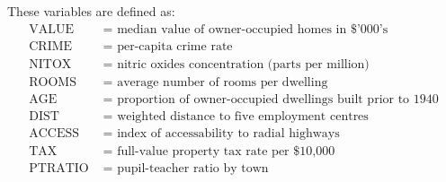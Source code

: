 \documentclass[12pt,a4paper]{article}
\begin{document}
These variables are defined as:
\begin{align*}
\mbox{ VALUE } & = \mbox{ median value of owner-occupied homes in \$'000's }\\
\mbox{ CRIME } & = \mbox{ per-capita crime rate }\\
\mbox{ NITOX } & = \mbox{ nitric oxides concentration (parts per million) }\\
\mbox{ ROOMS } & = \mbox{ average number of rooms per dwelling }\\
\mbox{ AGE } & = \mbox{ proportion of owner-occupied dwellings built prior to 1940 }\\
\mbox{ DIST } & = \mbox{ weighted distance to five employment centres }\\
\mbox{ ACCESS }& = \mbox{ index of accessability to radial highways } \\
\mbox{ TAX } & = \mbox{ full-value property tax rate per \$10,000 }\\
\mbox{ PTRATIO } & = \mbox{ pupil-teacher ratio by town  }\\
\end{align*}
\end{document}
